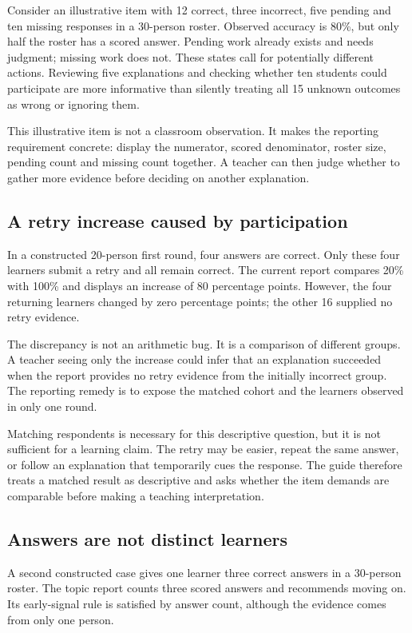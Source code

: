 Consider an illustrative item with 12 correct, three incorrect, five pending and ten missing responses in a 30-person roster. Observed accuracy is 80\%, but only half the roster has a scored answer. Pending work already exists and needs judgment; missing work does not. These states call for potentially different actions. Reviewing five explanations and checking whether ten students could participate are more informative than silently treating all 15 unknown outcomes as wrong or ignoring them.

This illustrative item is not a classroom observation. It makes the reporting requirement concrete: display the numerator, scored denominator, roster size, pending count and missing count together. A teacher can then judge whether to gather more evidence before deciding on another explanation.

\subsection{A retry increase caused by participation}
In a constructed 20-person first round, four answers are correct. Only these four learners submit a retry and all remain correct. The current report compares 20\% with 100\% and displays an increase of 80 percentage points. However, the four returning learners changed by zero percentage points; the other 16 supplied no retry evidence.

The discrepancy is not an arithmetic bug. It is a comparison of different groups. A teacher seeing only the increase could infer that an explanation succeeded when the report provides no retry evidence from the initially incorrect group. The reporting remedy is to expose the matched cohort and the learners observed in only one round.

Matching respondents is necessary for this descriptive question, but it is not sufficient for a learning claim. The retry may be easier, repeat the same answer, or follow an explanation that temporarily cues the response. The guide therefore treats a matched result as descriptive and asks whether the item demands are comparable before making a teaching interpretation.

\subsection{Answers are not distinct learners}
A second constructed case gives one learner three correct answers in a 30-person roster. The topic report counts three scored answers and recommends moving on. Its early-signal rule is satisfied by answer count, although the evidence comes from only one person.

